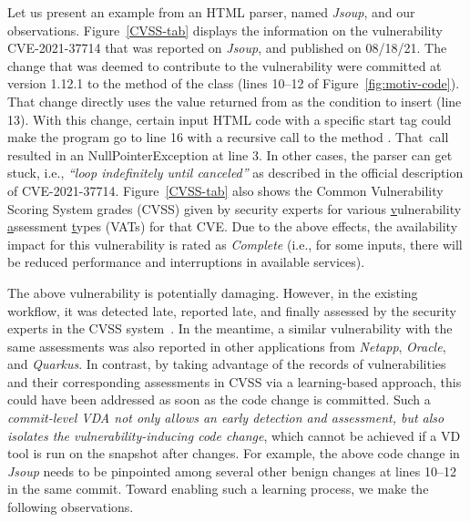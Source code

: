 Let us present an example from an HTML parser, named {\em Jsoup}, and
our observations. Figure~\ref{CVSS-tab} displays the information on
the vulnerability CVE-2021-37714 that was reported on {\em Jsoup}, and
published on 08/18/21. The change that was deemed to contribute to the
vulnerability were committed at version 1.12.1 to the method
 of the
 class (lines 10--12 of
Figure~\ref{fig:motiv-code}). That change directly uses the value
returned from  as the condition to
insert  (line 13). With this change, certain input HTML
code with a specific start tag could make the program go to line 16
with a recursive call to the method . That~call
resulted in an NullPointerException at line 3.
In other cases, the parser can get stuck, i.e., {\em ``loop
  indefinitely until canceled''} as described in the official
description of CVE-2021-37714. Figure~\ref{CVSS-tab} also shows the
Common Vulnerability Scoring System grades (CVSS) given by security
experts for various \underline{v}ulnerability \underline{a}ssessment
\underline{t}ypes (VATs) for that CVE. Due to the above effects, the
availability impact for this vulnerability is rated as {\em Complete}
(i.e., for some inputs, there will be reduced performance and
interruptions in available services).


The above vulnerability is potentially damaging. However, in the
existing workflow, it was detected late, reported late, and finally
assessed by the security experts in the CVSS
system~\cite{first-website}. In the meantime, a similar vulnerability
with the same assessments was also reported in other applications from
{\em Netapp}, {\em Oracle}, and {\em Quarkus}. In contrast, by taking
advantage of the records of vulnerabilities and their corresponding
assessments in CVSS via a learning-based approach, this could have
been addressed as soon as the code change is committed.  Such a
{\em commit-level VDA not only allows an early detection and assessment,
but also isolates the vulnerability-inducing code change}, which cannot
be achieved if a VD tool is run on the snapshot after changes.  For
example, the above code change in {\em Jsoup} needs to be pinpointed
among several other benign changes at lines 10--12 in the same commit. Toward enabling
such a learning process, we make the following observations.

